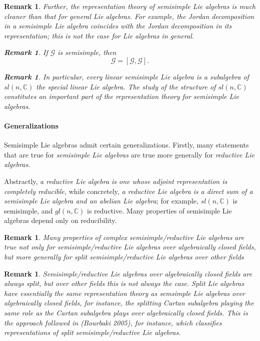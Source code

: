 \documentclass[aps,preprint]{revtex4}%
\newtheorem{remark}[theorem]{Remark}
\begin{document}
\begin{remark}
Further, the representation theory of semisimple Lie algebras is much cleaner
than that for general Lie algebras. For example, the Jordan decomposition in a
semisimple Lie algebra coincides with the Jordan decomposition in its
representation; this is not the case for Lie algebras in general.

\begin{remark}
If $\mathcal{G}$ is semisimple, then
\begin{equation}
\mathcal{G}=\left[  \mathcal{G},\mathcal{G}\right]  .
\end{equation}

\end{remark}

\begin{remark}
In particular, every \emph{linear semisimple Lie algebra} is a subalgebra of
$sl\left(  n,\mathbb{C}\right)  $ the special linear Lie algebra. The study of
the structure of $sl\left(  n,\mathbb{C}\right)  $ constitutes an important
part of the representation theory for semisimple Lie algebras.
\end{remark}
\end{remark}

\paragraph{Generalizations}

Semisimple Lie algebras admit certain generalizations. Firstly, many
statements that are true for \emph{semisimple Lie algebras} are true more
generally for \emph{reductive Lie algebras}.

Abstractly, \emph{a reductive Lie algebra is one whose adjoint representation
is completely reducible,} while concretely, \emph{a reductive Lie algebra is a
direct sum of a semisimple Lie algebra and an abelian Lie algebra}; for
example, $sl\left(  n,\mathbb{C}\right)  $ is semisimple, and $gl\left(
n,\mathbb{C}\right)  $ is reductive. Many properties of semisimple Lie
algebras depend only on reducibility.

\begin{remark}
Many properties of complex semisimple/reductive Lie algebras are true not only
for semisimple/reductive Lie algebras over algebraically closed fields, but
more generally for \emph{split semisimple/reductive} Lie algebras over other fields
\end{remark}

\begin{remark}
Semisimple/reductive Lie algebras over algebraically closed fields are always
split, but over other fields this is not always the case. Split Lie algebras
have essentially the same representation theory as semsimple Lie algebras over
algebraically closed fields, for instance, the splitting Cartan subalgebra
playing the same role as the Cartan subalgebra plays over algebraically closed
fields. This is the approach followed in (Bourbaki 2005), for instance, which
classifies representations of split semisimple/reductive Lie algebras.
\end{remark}
\end{document}
